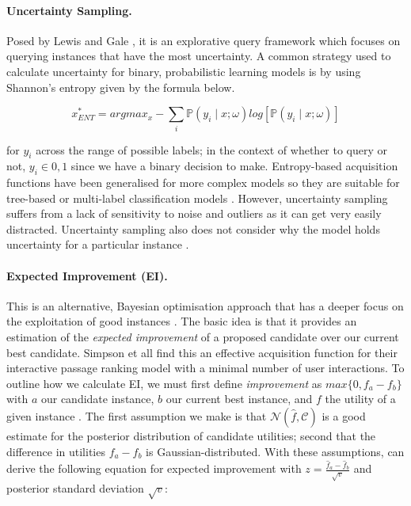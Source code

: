 \documentclass[ %
                    author={James Stephenson},
                supervisor={Dr. Edwin Simpson},
                    degree={MSc},
                     title={Project Plan: Bayesian Deep Learning For Extractive Test Summarisation},
                  subtitle={},
                      type={},
                      year={2022}]{../additions/dissertation}
\begin{document}
			\paragraph{Uncertainty Sampling.} Posed by Lewis and Gale \cite{Lewis94}, it is an explorative query framework which focuses on querying instances that have the most uncertainty. A common strategy used to calculate uncertainty for binary, probabilistic learning models is by using Shannon’s entropy \cite{Shannon48} given by the formula below.

	$$
		x^{\ast}_{ENT} = argmax_{x} - \sum_i \mathbb{P}(y_i \mid x; \omega) log \left[ \mathbb{P}(y_i \mid x; \omega) \right]
	$$
	
		\noindent
		for $y_i$ across the range of possible labels; in the context of whether to query or not, $y_i \in {0,1}$ since we have a binary decision to make. Entropy-based acquisition functions have been generalised for more complex models so they are suitable for tree-based or multi-label classification models \cite{Craven08, Hwa04}. However, uncertainty sampling suffers from a lack of sensitivity to noise and outliers as it can get very easily distracted. Uncertainty sampling also does not consider why the model holds uncertainty for a particular instance \cite{Sharma17}.

		\paragraph{Expected Improvement (EI).} This is an alternative, Bayesian optimisation approach that has a deeper focus on the exploitation of good instances \cite{Mockus75}. The basic idea is that it provides an estimation of the \emph{expected improvement} of a proposed candidate over our current best candidate. Simpson et all \cite{Simpson19} find this an effective acquisition function for their interactive passage ranking model with a minimal number of user interactions. To outline how we calculate EI, we must first define \emph{improvement} as $max\{0, f_a - f_b\}$ with $a$ our candidate instance, $b$ our current best instance, and $f$ the utility of a given instance \cite{Simpson19}. The first assumption we make is that $\mathcal{N}(\hat{f}, \mathcal{C})$ is a good estimate for the posterior distribution of candidate utilities; second that the difference in utilities $f_a - f_b$ is Gaussian-distributed. With these assumptions, can derive the following equation for expected improvement with $z = \frac{\hat{f}_a - \hat{f}_b}{\sqrt{v}}$ and posterior standard deviation $\sqrt{v}$:
\end{document}
